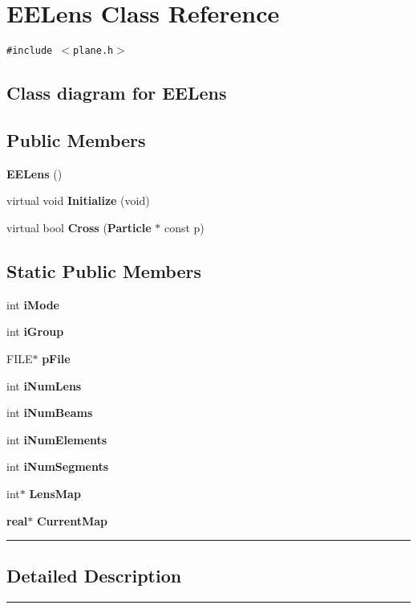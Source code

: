 \section{EELens  Class Reference}
\label{EELens}


{\tt \#include $<$plane.h$>$}

\subsection*{Class diagram for EELens}
\begin{figure}[H]
\begin{center}
\leavevmode
\setlength{\epsfysize}{3cm}
\end{center}
\end{figure}
\subsection*{Public Members}
\begin{CompactItemize}
\item 
{\bf EELens} ()
\item 
virtual void {\bf Initialize} (void)
\item 
virtual bool {\bf Cross} ({\bf Particle} $\ast$ const p)
\end{CompactItemize}
\subsection*{Static Public Members}
\begin{CompactItemize}
\item 
int {\bf i\-Mode}
\item 
int {\bf i\-Group}
\item 
FILE$\ast$ {\bf p\-File}
\item 
int {\bf i\-Num\-Lens}
\item 
int {\bf i\-Num\-Beams}
\item 
int {\bf i\-Num\-Elements}
\item 
int {\bf i\-Num\-Segments}
\item 
int$\ast$ {\bf Lens\-Map}
\item 
{\bf real}$\ast$ {\bf Current\-Map}
\end{CompactItemize}
\vspace{0.4cm}\hrule\vspace{0.2cm}
\subsection*{Detailed Description}
\vspace{0.4cm}\hrule\vspace{0.2cm}
